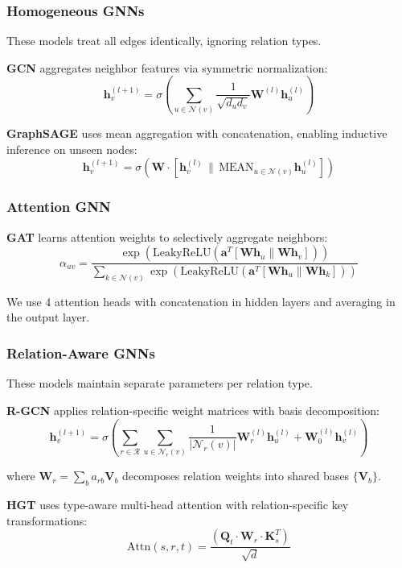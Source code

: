 \documentclass[conference]{IEEEtran}
\begin{document}
\subsubsection{Homogeneous GNNs}

These models treat all edges identically, ignoring relation types.

\textbf{GCN} \cite{kipf2017semi} aggregates neighbor features via symmetric normalization:
$$\mathbf{h}_v^{(l+1)} = \sigma\!\left(\sum_{u \in \mathcal{N}(v)} \frac{1}{\sqrt{d_u d_v}} \mathbf{W}^{(l)} \mathbf{h}_u^{(l)}\right)$$

\textbf{GraphSAGE} \cite{hamilton2017inductive} uses mean aggregation with concatenation, enabling inductive inference on unseen nodes:
$$\mathbf{h}_v^{(l+1)} = \sigma\!\left(\mathbf{W} \cdot \left[\mathbf{h}_v^{(l)} \,\|\, \text{MEAN}_{u \in \mathcal{N}(v)}\mathbf{h}_u^{(l)}\right]\right)$$

\subsubsection{Attention GNN}

\textbf{GAT} \cite{velickovic2018graph} learns attention weights to selectively aggregate neighbors:
$$\alpha_{uv} = \frac{\exp(\text{LeakyReLU}(\mathbf{a}^T[\mathbf{W}\mathbf{h}_u \| \mathbf{W}\mathbf{h}_v]))}{\sum_{k \in \mathcal{N}(v)} \exp(\text{LeakyReLU}(\mathbf{a}^T[\mathbf{W}\mathbf{h}_u \| \mathbf{W}\mathbf{h}_k]))}$$

We use 4 attention heads with concatenation in hidden layers and averaging in the output layer.

\subsubsection{Relation-Aware GNNs}

These models maintain separate parameters per relation type.

\textbf{R-GCN} \cite{schlichtkrull2018modeling} applies relation-specific weight matrices with basis decomposition:
$$\mathbf{h}_v^{(l+1)} = \sigma\!\left(\sum_{r \in \mathcal{R}} \sum_{u \in \mathcal{N}_r(v)} \frac{1}{|\mathcal{N}_r(v)|} \mathbf{W}_r^{(l)} \mathbf{h}_u^{(l)} + \mathbf{W}_0^{(l)} \mathbf{h}_v^{(l)}\right)$$

where $\mathbf{W}_r = \sum_b a_{rb} \mathbf{V}_b$ decomposes relation weights into shared bases $\{\mathbf{V}_b\}$.

\textbf{HGT} \cite{hu2020hgt} uses type-aware multi-head attention with relation-specific key transformations:
$$\text{Attn}(s,r,t) = \frac{(\mathbf{Q}_t \cdot \mathbf{W}_r \cdot \mathbf{K}_s^T)}{\sqrt{d}}$$
\end{document}
